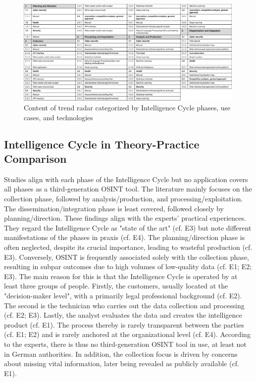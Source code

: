 \documentclass[10pt]{article}
\begin{document}
\begin{figure}[thb]
    \centering
    \includegraphics[width=0.99\textwidth]{PDF/images/crop_Trendradar explanation}
    \caption{Content of trend radar categorized by Intelligence Cycle phases, use cases, and technologies}
    \label{fig:trendradarexplanation}
\end{figure}

\subsection{Intelligence Cycle in Theory-Practice Comparison}

Studies align with each phase of the Intelligence Cycle but no application covers all phases as a third-generation OSINT tool. The literature mainly focuses on the collection phase, followed by analysis/production, and processing/exploitation. The dissemination/integration phase is least covered, followed closely by planning/direction.
These findings align with the experts' practical experiences. They regard the Intelligence Cycle as "state of the art" (cf. E3) but note different manifestations of the phases in praxis (cf. E4).
The planning/direction phase is often neglected, despite its crucial importance, leading to wasteful production (cf. E3). Conversely, OSINT is frequently associated solely with the collection phase,
resulting in subpar outcomes due to high volumes of low-quality data (cf. E1; E2; E3). The main reason for this is that the Intelligence Cycle is operated by at least three groups of people. Firstly, the customers, usually located at the "decision-maker level", with a primarily legal professional background (cf. E2).
The second is the technician who carries out the data collection and processing (cf. E2; E3). Lastly, the analyst evaluates the data and creates the intelligence product (cf. E1). The process thereby is rarely transparent between the parties
(cf. E1; E2) and is rarely anchored at the organizational level (cf. E4). According to the experts, there is thus no third-generation
OSINT tool in use, at least not in German authorities. In addition, the collection focus is driven by concerns about missing vital information, later being revealed as publicly available (cf. E1).
\end{document}
